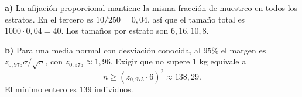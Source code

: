 \textbf{a)} La afijación proporcional mantiene la misma fracción de muestreo en todos los estratos. En el tercero es $10/250=0{,}04$, así que el tamaño total es $1000\cdot0{,}04=\boxed{40}$. Los tamaños por estrato son $6,16,10,8$.

\textbf{b)} Para una media normal con desviación conocida, al $95\%$ el margen es $z_{0{,}975}\sigma/\sqrt n$, con $z_{0{,}975}\approx1{,}96$. Exigir que no supere $1$ kg equivale a
\[
n\ge (z_{0{,}975}\cdot6)^2\approx138{,}29.
\]
El mínimo entero es $\boxed{139\text{ individuos}}$.
